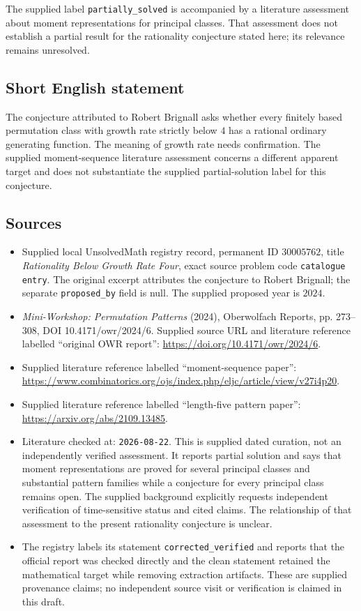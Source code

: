 \documentclass[11pt]{article}
\begin{document}
The supplied label \texttt{partially\_solved} is accompanied by a literature assessment about moment representations for principal classes. That assessment does not establish a partial result for the rationality conjecture stated here; its relevance remains unresolved.
\subsection{Short English statement}
The conjecture attributed to Robert Brignall asks whether every finitely based permutation class with growth rate strictly below \(4\) has a rational ordinary generating function. The meaning of growth rate needs confirmation. The supplied moment-sequence literature assessment concerns a different apparent target and does not substantiate the supplied partial-solution label for this conjecture.
\subsection{Sources}
\begin{itemize}
\item Supplied local UnsolvedMath registry record, permanent ID \(30005762\), title \emph{Rationality Below Growth Rate Four}, exact source problem code \texttt{catalogue entry}. The original excerpt attributes the conjecture to Robert Brignall; the separate \texttt{proposed\_by} field is null. The supplied proposed year is \(2024\).
\item \emph{Mini-Workshop: Permutation Patterns} (2024), Oberwolfach Reports, pp. 273--308, DOI 10.4171/owr/2024/6. Supplied source URL and literature reference labelled ``original OWR report'': \url{https://doi.org/10.4171/owr/2024/6}.
\item Supplied literature reference labelled ``moment-sequence paper'': \url{https://www.combinatorics.org/ojs/index.php/eljc/article/view/v27i4p20}.
\item Supplied literature reference labelled ``length-five pattern paper'': \url{https://arxiv.org/abs/2109.13485}.
\item Literature checked at: \texttt{2026-08-22}. This is supplied dated curation, not an independently verified assessment. It reports partial solution and says that moment representations are proved for several principal classes and substantial pattern families while a conjecture for every principal class remains open. The supplied background explicitly requests independent verification of time-sensitive status and cited claims. The relationship of that assessment to the present rationality conjecture is unclear.
\item The registry labels its statement \texttt{corrected\_verified} and reports that the official report was checked directly and the clean statement retained the mathematical target while removing extraction artifacts. These are supplied provenance claims; no independent source visit or verification is claimed in this draft.
\end{itemize}
\end{document}
